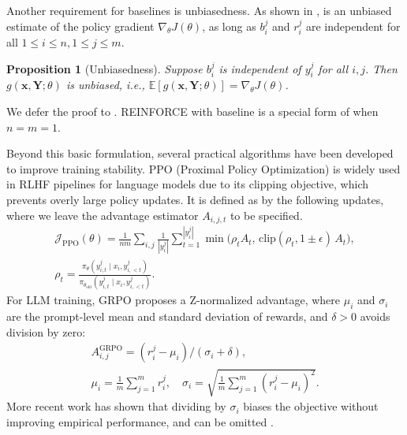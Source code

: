\documentclass{article}
\renewcommand{\vec}[1]{\mathbf{#1}}
\theoremstyle{plain}
\newtheorem{proposition}{Proposition}
\theoremstyle{definition}
\theoremstyle{remark}
\newcommand{\E}{\mathbb{E}}
\begin{document}
Another requirement for baselines is unbiasedness. As shown in ,  is an unbiased estimate of the policy gradient $\nabla_\theta J(\theta)$, as long as $b_i^j$ and $r_i^j$ are independent for all $1\leq i\leq n, 1\leq j\leq m$.
\begin{propositionbox}
\begin{proposition}[Unbiasedness]
\label{prop:unbiased}
Suppose $b_i^j$ is independent of $y_i^j$ for all $i,j$. Then $g(\vec x, \vec Y;\theta)$ is unbiased, i.e., $\E[g(\vec x, \vec Y;\theta)] = \nabla_\theta J(\theta)$.
\end{proposition}
\end{propositionbox}
We defer the proof to . REINFORCE with baseline is a special form of  when $n=m=1$.  
  
Beyond this basic formulation, several practical algorithms have been developed to improve training stability. PPO (Proximal Policy Optimization) \citep{schulman2017proximal} is widely used in RLHF pipelines for language models due to its clipping objective, which prevents overly large policy updates. It is defined as by the following updates, where we leave the advantage estimator  $A_{i,j,t}$ to be specified.
\begin{gather*}
\textstyle \mathcal{J}_{\mathrm{PPO}}(\theta) = \tfrac{1}{nm}\sum_{i,j}\tfrac{1}{|y_i^j|}\sum_{t=1}^{|y_i^j|} \min\bigl(\rho_t A_t,\,\mathrm{clip}(\rho_t,1\pm\epsilon)\,A_t\bigr),\\
\textstyle \rho_t = \tfrac{\pi_\theta(y_{i,t}^j\mid x_i,y_{i,<t}^j)}{\pi_{\theta_{\mathrm{old}}}(y_{i,t}^j\mid x_i,y_{i,<t}^j)}.
\end{gather*}
For LLM training, GRPO \citep{shao2024deepseekmath} proposes a Z-normalized advantage, where $\mu_i$ and $\sigma_i$ are the prompt-level mean and standard deviation of rewards, and $\delta > 0$ avoids division by zero:
\begin{gather*}
\textstyle A_{i,j}^{\mathrm{GRPO}} = (r_i^j - \mu_i)/(\sigma_i + \delta),\\
\textstyle \mu_i = \tfrac{1}{m}\sum_{j=1}^m r_i^j, \quad \sigma_i = \sqrt{\tfrac{1}{m}\sum_{j=1}^m (r_i^j - \mu_i)^2}.
\end{gather*}
More recent work has shown that dividing by $\sigma_i$ biases the objective \citep{liu2025understanding} without improving empirical performance, and can be omitted \citep{deepseekai2025deepseekv32pushingfrontieropen,khatri2025art}.


\vspace{-5pt}
\end{document}
